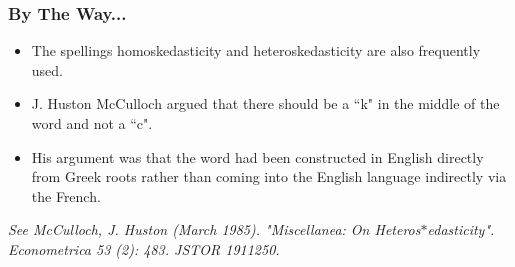 \documentclass{beamer}
\begin{document}
\begin{frame}
	\frametitle{By The Way...}
	\Large
	\begin{itemize}
		\item 	The spellings homoskedasticity and heteroskedasticity are also frequently used.
		\item  J. Huston McCulloch argued that there should be a ``k" in the middle of the word and not a ``c".
		\item  His argument was that the word had been constructed in English directly from Greek roots rather than coming into the English language indirectly via the French. 
	\end{itemize}
	
	{
		\normalsize	
		\noindent \textit{See McCulloch, J. Huston (March 1985). "Miscellanea: On Heteros$\ast$edasticity". Econometrica 53 (2): 483. JSTOR 1911250.}
	}
\end{frame}
\end{document}
